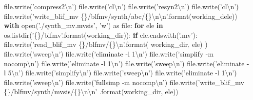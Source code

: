 \documentclass[italian,]{book}
\newenvironment{Shaded}{\begin{snugshade}}{\end{snugshade}}
\newcommand{\BuiltInTok}[1]{#1}
\newcommand{\CharTok}[1]{\textcolor[rgb]{0.31,0.60,0.02}{#1}}
\newcommand{\ControlFlowTok}[1]{\textcolor[rgb]{0.13,0.29,0.53}{\textbf{#1}}}
\newcommand{\ImportTok}[1]{#1}
\newcommand{\KeywordTok}[1]{\textcolor[rgb]{0.13,0.29,0.53}{\textbf{#1}}}
\newcommand{\NormalTok}[1]{#1}
\newcommand{\SpecialCharTok}[1]{\textcolor[rgb]{0.00,0.00,0.00}{#1}}
\newcommand{\StringTok}[1]{\textcolor[rgb]{0.31,0.60,0.02}{#1}}
\begin{document}
\begin{Shaded}
\begin{Highlighting}[]
        \BuiltInTok{file}\NormalTok{.write(}\StringTok{'compress2}\CharTok{\textbackslash{}n}\StringTok{'}\NormalTok{)}
        \BuiltInTok{file}\NormalTok{.write(}\StringTok{'cl}\CharTok{\textbackslash{}n}\StringTok{'}\NormalTok{)}
        \BuiltInTok{file}\NormalTok{.write(}\StringTok{'resyn2}\CharTok{\textbackslash{}n}\StringTok{'}\NormalTok{)}
        \BuiltInTok{file}\NormalTok{.write(}\StringTok{'cl}\CharTok{\textbackslash{}n}\StringTok{'}\NormalTok{)}
        \BuiltInTok{file}\NormalTok{.write(}\StringTok{'write_blif_mv }\SpecialCharTok{\{\}}\StringTok{/blfmv/synth/abc/}\SpecialCharTok{\{\}}\CharTok{\textbackslash{}n\textbackslash{}n}\StringTok{'}\NormalTok{.}\BuiltInTok{format}\NormalTok{(working_dele))}
  \ControlFlowTok{with} \BuiltInTok{open}\NormalTok{(}\StringTok{'./synth_mv.mvsis'}\NormalTok{, }\StringTok{'w'}\NormalTok{) }\ImportTok{as} \BuiltInTok{file}\NormalTok{:}
    \ControlFlowTok{for}\NormalTok{ ele }\KeywordTok{in}\NormalTok{ os.listdir(}\StringTok{'}\SpecialCharTok{\{\}}\StringTok{/blfmv'}\NormalTok{.}\BuiltInTok{format}\NormalTok{(working_dir)):}
      \ControlFlowTok{if}\NormalTok{ ele.endswith(}\StringTok{'.mv'}\NormalTok{):}
        \BuiltInTok{file}\NormalTok{.write(}\StringTok{'read_blif_mv }\SpecialCharTok{\{\}}\StringTok{/blfmv/}\SpecialCharTok{\{\}}\CharTok{\textbackslash{}n}\StringTok{'}\NormalTok{.}\BuiltInTok{format}\NormalTok{(}
\NormalTok{          working_dir, ele)}
\NormalTok{        )}
        \BuiltInTok{file}\NormalTok{.write(}\StringTok{'sweep}\CharTok{\textbackslash{}n}\StringTok{'}\NormalTok{)}
        \BuiltInTok{file}\NormalTok{.write(}\StringTok{'eliminate -l 1}\CharTok{\textbackslash{}n}\StringTok{'}\NormalTok{)}
        \BuiltInTok{file}\NormalTok{.write(}\StringTok{'simplify -m nocomp}\CharTok{\textbackslash{}n}\StringTok{'}\NormalTok{)}
        \BuiltInTok{file}\NormalTok{.write(}\StringTok{'eliminate -l 1}\CharTok{\textbackslash{}n}\StringTok{'}\NormalTok{)}
        \BuiltInTok{file}\NormalTok{.write(}\StringTok{'sweep}\CharTok{\textbackslash{}n}\StringTok{'}\NormalTok{)}
        \BuiltInTok{file}\NormalTok{.write(}\StringTok{'eliminate -l 5}\CharTok{\textbackslash{}n}\StringTok{'}\NormalTok{)}
        \BuiltInTok{file}\NormalTok{.write(}\StringTok{'simplify}\CharTok{\textbackslash{}n}\StringTok{'}\NormalTok{)}
        \BuiltInTok{file}\NormalTok{.write(}\StringTok{'sweep}\CharTok{\textbackslash{}n}\StringTok{'}\NormalTok{)}
        \BuiltInTok{file}\NormalTok{.write(}\StringTok{'eliminate -l 1}\CharTok{\textbackslash{}n}\StringTok{'}\NormalTok{)}
        \BuiltInTok{file}\NormalTok{.write(}\StringTok{'sweep}\CharTok{\textbackslash{}n}\StringTok{'}\NormalTok{)}
        \BuiltInTok{file}\NormalTok{.write(}\StringTok{'fullsimp -m nocomp}\CharTok{\textbackslash{}n}\StringTok{'}\NormalTok{)}
        \BuiltInTok{file}\NormalTok{.write(}\StringTok{'write_blif_mv }\SpecialCharTok{\{\}}\StringTok{/blfmv/synth/mvsis/}\SpecialCharTok{\{\}}\CharTok{\textbackslash{}n\textbackslash{}n}\StringTok{'}
\NormalTok{          .}\BuiltInTok{format}\NormalTok{(working_dir, ele))}
\end{Highlighting}
\end{Shaded}
\end{document}
